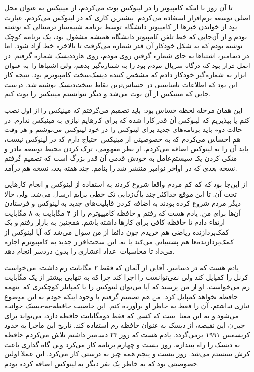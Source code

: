 تا آن روز با اینکه کامپیوتر را در لینوکس بوت می‌کردم، از مینیکس به
عنوان محل اصلی توسعه نرم‌افزار استفاده می‌کردم. بیشترین کاری که در
لینوکس می‌کردم، عبارت بود از خواندن خبرها از کامپیوتر دانشگاه توسط
برنامه شبیه‌ساز ترمینالی که نوشته بودم و از آن‌جایی که خط تلفن کامپیوتر
دانشگاه همیشه مشغول بود،‌ یک برنامه کوچک نوشته بودم که به شکل خودکار آن
قدر شماره می‌گرفت تا بالاخره خط آزاد شود. اما در دسامبر، اشتباها به جای
شماره گرفتن روی مودم، روی هارددیسک شماره گرفتم. در اصل قرار بود
 که درگاه سریال مودم بود را به شماره‌گیر بدهم، ولی
اشتباها  را به عنوان ابزار به شماره‌گیر خودکار دادم که
مشخص کننده دیسک‌سخت کامپیوترم بود. نتیجه کار این بود که اطلاعات
نامناسبی در حساس‌ترین نقاط سخت‌دیسک نوشته شد. درست جایی که مینیکس از آن
بوت می‌شد و دیگر نتوانستم مینیکس را بوت کنم.

این همان مرحله لحظه حساس بود: باید تصمیم می‌گرفتم که مینیکس را از اول
نصب کنم یا بپذیریم که لینوکس آن قدر کارا شده که برای کارهایم نیازی به
مینیکس ندارم. در حالت دوم باید برنامه‌های جدید برای لینوکس را در خود
لینوکس می‌نوشتم و هر وقت هم احساس می‌کردم که به خصوصیتی از مینیکس احتیاج
دارم که در لینوکس نیست، باید آن را به لینوکس اضافه می‌کردم. از نظر
مفهومی، ترک کردن محیط توسعه مادر و متکی کردن یک سیستم‌عامل به خودش قدمی
آن قدر بزرگ است که تصمیم گرفتم نسخه بعدی که در اواخر نوامبر منتشر شد
را  بنامم. چند هفته بعد، نسخه  هم درآمد.

از این‌جا بود که کم کم مردم واقعا شروع کردند به استفاده از لینوکس و
انجام کارهایی تحت آن. تا این موقع حداکثر چند باگ‌زدایی تک خطی برایم
ارسال می‌شد. ولی حالا دیگر مردم شروع کرده بودند به اضافه کردن قابلیت‌های
جدید به لینوکس و فرستادن آن‌ها برای من. یادم هست که رفتم و حافظه
کامپیوترم را از ۴ مگابایت به ۸ مگابایت ارتقاء دادم تا حافظه کافی برای
کارها داشته باشم. همچنین به بازار رفتم و یک کمک‌پردازنده ریاضی هم خریدم
چون دائما از من سوال می‌شد که آیا لینوکس از کمک‌پردازنده‌ها هم پشتیبانی
می‌کند یا نه. این سخت‌افزار جدید به کامپیوترم اجازه می‌داد تا محاسبات
اعداد اعشاری را بدون دردسر انجام دهد.

یادم هست که در دسامبر، آقایی از آلمان که فقط ۲ مگابایت رم داشت،
می‌خواست کرنل را کمپایل کند ولی نمی‌توانست  را اجرا کند چرا که
 به تنهایی بیشتر از یک مگابایت رم می‌خواست. او از من پرسید که
آیا می‌توان لینوکس را با کمپایلر کوچکتری که اینهمه حافظه نخواهد کمپایل
کرد. من هم تصمیم‌ گرفتم با وجود اینکه خودم به این موضوع نیازی نداشتم،
آن را فقط به خاطر او برآورده کنم. این خاصیت
حافظه-به-دیسک خوانده می‌شود و به این معنا است
که کسی که فقط دومگابایت حافظه دارد، می‌تواند برای جبران این نقیصه، از
دیسک به عنوان حافظه رم استفاده کند. تاریخ این ماجرا به حدود کریسمس
۱۹۹۱ برمی‌گردد. یادم هست که روز ۲۳ دسامبر داشتم تلاش می‌کردم حافظه به
دیسک را راه بیندازم. روز بیست و چهارم برنامه کار می‌کرد ولی گاه گداری
باعث کرش سیستم می‌شد. روز بیست و پنجم همه چیز به درستی کار می‌کرد. این
عملا اولین خصوصیتی بود که به خاطر یک نفر دیگر به لینوکس اضافه کرده
بودم.

